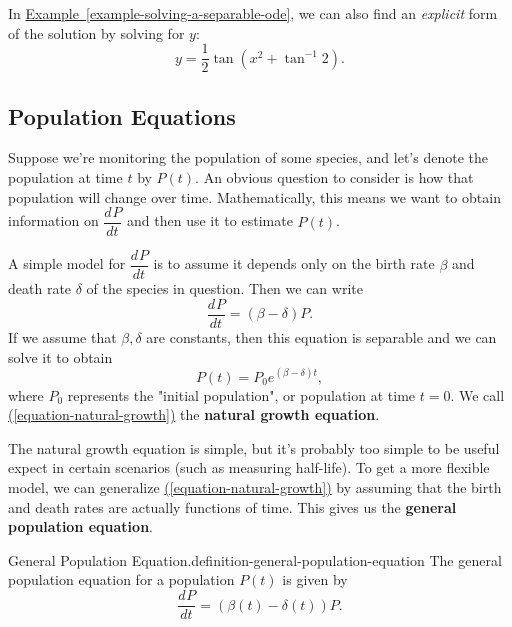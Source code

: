 \documentclass[10pt,]{book}
\newcommand{\terminology}[1]{\textbf{#1}}
\numberwithin{equation}{section}
\newcommand{\dv}[3][]{\dfrac{d^{#1} #2}{d #3^{#1}}}
\begin{document}
\hypertarget{p-735}{}%
In \hyperref[example-solving-a-separable-ode]{Example~\ref{example-solving-a-separable-ode}}, we can also find an \emph{explicit} form of the solution by solving for \(y\):%
\begin{equation*}
y = \frac{1}{2}\tan(x^{2} + \tan^{-1}2).
\end{equation*}
%
%
%
\typeout{************************************************}
\typeout{************************************************}
%
\subsection[{Population Equations}]{Population Equations}\label{subsection-population-equations}
\hypertarget{p-736}{}%
Suppose we're monitoring the population of some species, and let's denote the population at time \(t\) by \(P(t)\). An obvious question to consider is how that population will change over time. Mathematically, this means we want to obtain information on \(\dv{P}{t}\) and then use it to estimate \(P(t)\).%
\par
\hypertarget{p-737}{}%
A simple model for \(\dv{P}{t}\) is to assume it depends only on the birth rate \(\beta\) and death rate \(\delta\) of the species in question. Then we can write%
\begin{equation}
\dv{P}{t} = (\beta - \delta)P.\label{equation-natural-growth}
\end{equation}
If we assume that \(\beta,\delta\) are constants, then this equation is separable and we can solve it to obtain%
\begin{equation*}
P(t) = P_{0}e^{(\beta - \delta)t},
\end{equation*}
where \(P_{0}\) represents the "initial population", or population at time \(t = 0\). We call \hyperref[equation-natural-growth]{(\ref{equation-natural-growth})} the \terminology{natural growth equation}.%
\par
\hypertarget{p-738}{}%
The natural growth equation is simple, but it's probably too simple to be useful expect in certain scenarios (such as measuring half-life). To get a more flexible model, we can generalize \hyperref[equation-natural-growth]{(\ref{equation-natural-growth})} by assuming that the birth and death rates are actually functions of time. This gives us the \terminology{general population equation}.%
\begin{definition}{General Population Equation.}{definition-general-population-equation}%
\hypertarget{p-739}{}%
The general population equation for a population \(P(t)\) is given by%
\begin{equation*}
\dv{P}{t} = (\beta(t) - \delta(t))P.
\end{equation*}
%
\end{definition}
\end{document}
